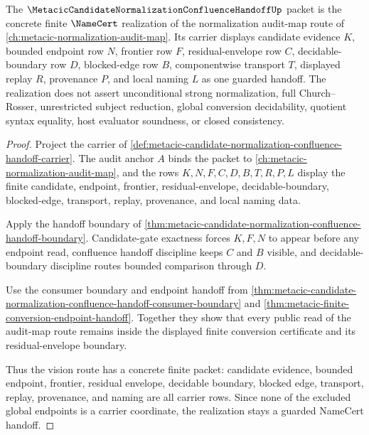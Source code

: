 \begin{theorem}
\label{thm:metacic-candidate-normalization-handoff-vision-concretization}
The $\MetacicCandidateNormalizationConfluenceHandoffUp$ packet is the concrete finite $\NameCert$ realization of the normalization audit-map route of \autoref{ch:metacic-normalization-audit-map}. Its carrier displays candidate evidence $K$, bounded endpoint row $N$, frontier row $F$, residual-envelope row $C$, decidable-boundary row $D$, blocked-edge row $B$, componentwise transport $T$, displayed replay $R$, provenance $P$, and local naming $L$ as one guarded handoff. The realization does not assert unconditional strong normalization, full Church--Rosser, unrestricted subject reduction, global conversion decidability, quotient syntax equality, host evaluator soundness, or closed consistency.
\end{theorem}
\begin{proof}
Project the carrier of \autoref{def:metacic-candidate-normalization-confluence-handoff-carrier}. The audit anchor $A$ binds the packet to \autoref{ch:metacic-normalization-audit-map}, and the rows $K,N,F,C,D,B,T,R,P,L$ display the finite candidate, endpoint, frontier, residual-envelope, decidable-boundary, blocked-edge, transport, replay, provenance, and local naming data.

Apply the handoff boundary of \autoref{thm:metacic-candidate-normalization-confluence-handoff-boundary}. Candidate-gate exactness forces $K,F,N$ to appear before any endpoint read, confluence handoff discipline keeps $C$ and $B$ visible, and decidable-boundary discipline routes bounded comparison through $D$.

Use the consumer boundary and endpoint handoff from \autoref{thm:metacic-candidate-normalization-confluence-handoff-consumer-boundary} and \autoref{thm:metacic-finite-conversion-endpoint-handoff}. Together they show that every public read of the audit-map route remains inside the displayed finite conversion certificate and its residual-envelope boundary.

Thus the vision route has a concrete finite packet: candidate evidence, bounded endpoint, frontier, residual envelope, decidable boundary, blocked edge, transport, replay, provenance, and naming are all carrier rows. Since none of the excluded global endpoints is a carrier coordinate, the realization stays a guarded NameCert handoff.
\end{proof}

